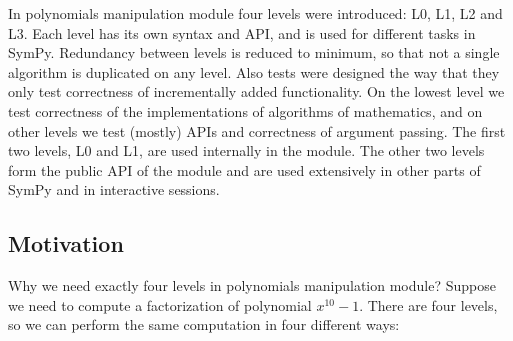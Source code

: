 In polynomials manipulation module four levels were introduced: L0, L1, L2 and L3. Each level
has its own syntax and API, and is used for different tasks in SymPy. Redundancy between
levels is reduced to minimum, so that not a single algorithm is duplicated on any level. Also
tests were designed the way that they only test correctness of incrementally added functionality.
On the lowest level we test correctness of the implementations of algorithms of mathematics, and
on other levels we test (mostly) APIs and correctness of argument passing. The first two levels,
L0 and L1, are used internally in the module. The other two levels form the public API of the
module and are used extensively in other parts of SymPy and in interactive sessions.


\subsection{Motivation}

Why we need exactly four levels in polynomials manipulation module? Suppose we need to compute
a factorization of polynomial $x^{10} - 1$. There are four levels, so we can perform the same
computation in four different ways:

